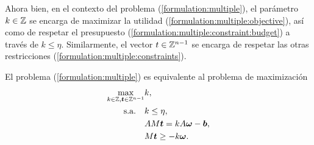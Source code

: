 Ahora bien, en el contexto del problema (\ref{formulation:multiple}), el parámetro $k \in \mathbb{Z}$ se
encarga de maximizar la utilidad (\ref{formulation:multiple:objective}), así como de respetar el
presupuesto (\ref{formulation:multiple:constraint:budget}) a través de $k \leq \eta$. Similarmente,
el vector $t \in \mathbb{Z}^{n-1}$ se encarga de respetar las otras restricciones
(\ref{formulation:multiple:constraints}).
\begin{theorem}
	El problema (\ref{formulation:multiple}) es equivalente al problema de maximización
	\begin{subequations}
		\label{formulation:lattice}
		\begin{align}
			\max_{k \in \mathbb{Z}, \boldsymbol{t} \in \mathbb{Z}^{n-1}}
				& k, \\
			\text{s.a.} \quad
				& k \leq \eta, \label{lattice:c-layer} \\
				& AM\boldsymbol{t} = kA\boldsymbol{\omega} - \boldsymbol{b}, \label{lattice:constraints} \\
				& M\boldsymbol{t} \geq -k\boldsymbol{\omega}.
		\end{align}
	\end{subequations}
\end{theorem}
